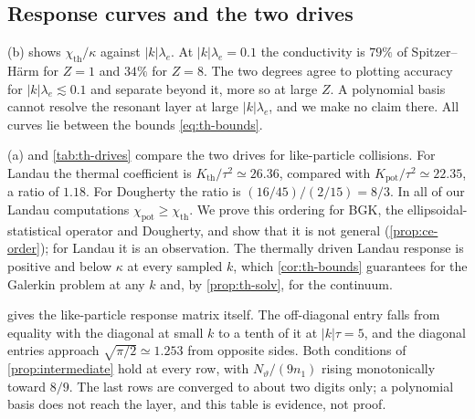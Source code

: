 \documentclass[11pt]{article}
\newcommand{\kap}{\kappa}
\newcommand{\thr}{\mathrm{th}}
\newcommand{\pot}{\mathrm{pot}}
\theoremstyle{definition}
\theoremstyle{remark}
\numberwithin{equation}{section}
\begin{document}
\subsection{Response curves and the two drives}

(b) shows $\chi_\thr/\kap$ against $|k|\lambda_e$. At
$|k|\lambda_e=0.1$ the conductivity is $79\%$ of Spitzer--H\"arm for
$Z=1$ and $34\%$ for $Z=8$. The two degrees agree to plotting accuracy
for $|k|\lambda_e\lesssim0.1$ and separate beyond it, more so at large
$Z$. A polynomial basis cannot resolve the resonant layer at large
$|k|\lambda_e$, and we make no claim there. All curves lie between the
bounds \eqref{eq:th-bounds}.

\begin{table}[tb]
\centering
\caption{Like-particle Landau collisions: the conductivity and the
leading deficit coefficients for the potential and thermal drives.}
\label{tab:th-drives}
\small

\end{table}

(a) and \cref{tab:th-drives} compare the two drives for
like-particle collisions. For Landau the thermal coefficient is
$K_\thr/\tau^2\simeq26.36$, compared with $K_\pot/\tau^2\simeq22.35$, a
ratio of $1.18$. For Dougherty the ratio is $(16/45)/(2/15)=8/3$. In all
of our Landau computations $\chi_\pot\geq\chi_\thr$. We prove this
ordering for BGK, the ellipsoidal-statistical operator and Dougherty, and
show that it is not general (\cref{prop:ce-order}); for Landau it is an
observation.
The thermally driven Landau response is positive and below $\kap$ at
every sampled $k$, which \cref{cor:th-bounds} guarantees for the Galerkin
problem at any $k$ and, by \cref{prop:th-solv}, for the continuum.

\begin{table}[tb]
\centering
\caption{Like-particle Landau collisions: the response matrix
\eqref{eq:th-matrix} at degree $16$, scaled by $|k|$, with the two
quantities of \cref{prop:intermediate}. The refinement column is the
largest change in an entry from degree $12$ to $16$, relative to
$M_{\parallel\parallel}$. The last row is the proved limit of
\cref{cor:th-landaulimit}.}
\label{tab:matrix}
\small

\end{table}

 gives the like-particle response matrix itself. The
off-diagonal entry falls from equality with the diagonal at small $k$ to
a tenth of it at $|k|\tau=5$, and the diagonal entries approach
$\sqrt{\pi/2}\simeq1.253$ from opposite sides. Both conditions of
\cref{prop:intermediate} hold at every row, with
$N_\vartheta/(9n_1)$ rising monotonically toward $8/9$. The last rows
are converged to about two digits only; a polynomial basis does not reach
the layer, and this table is evidence, not proof.
\end{document}
